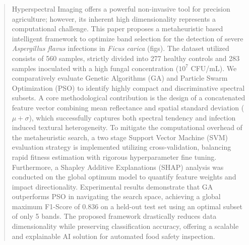 \documentclass[runningheads]{llncs}
\begin{document}
\begin{abstract}
Hyperspectral Imaging offers a powerful non-invasive tool for precision agriculture; however, its inherent high dimensionality represents a computational challenge. This paper proposes a metaheuristic based intelligent framework to optimize band selection for the detection of severe \textit{Aspergillus flavus} infections in \textit{Ficus carica} (figs). The dataset utilized consists of 560 samples, strictly divided into 277 healthy controls and 283 samples inoculated with a high fungal concentration ($10^7$ CFU/mL). We comparatively evaluate Genetic Algorithms (GA) and Particle Swarm Optimization (PSO) to identify highly compact and discriminative spectral subsets. A core methodological contribution is the design of a concatenated feature vector combining mean reflectance and spatial standard deviation ($\mu + \sigma$), which successfully captures both spectral tendency and infection induced textural heterogeneity. To mitigate the computational overhead of the metaheuristic search, a two stage Support Vector Machine (SVM) evaluation strategy is implemented utilizing cross-validation, balancing rapid fitness estimation with rigorous hyperparameter fine tuning. Furthermore, a Shapley Additive Explanations (SHAP) analysis was conducted on the global optimum model to quantify feature weights and impact directionality. Experimental results demonstrate that GA outperforms PSO in navigating the search space, achieving a global maximum F1-Score of 0.836 on a held-out test set using an optimal subset of only 5 bands. The proposed framework drastically reduces data dimensionality while preserving classification accuracy, offering a scalable and explainable AI solution for automated food safety inspection.

\end{abstract}
%
%
%
\end{document}
